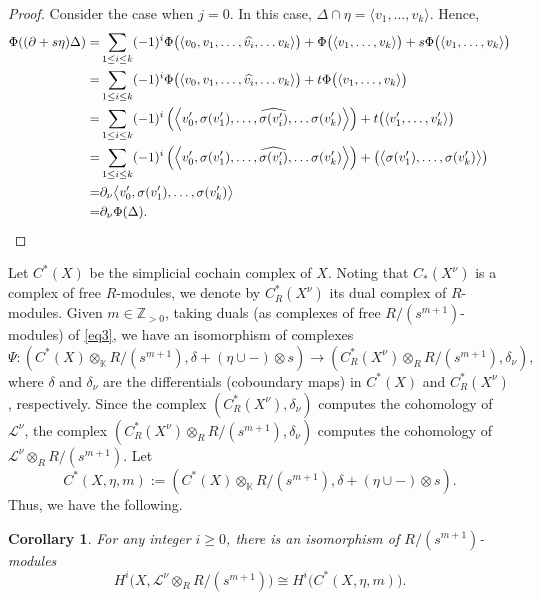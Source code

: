 \documentclass[12pt,leqno,twoside]{amsart}
\theoremstyle{plain}
\newtheorem{cor}[theorem]{Corollary}
\theoremstyle{definition}
\newcommand{\Z}{\mathbb{Z}}
\newcommand{\K}{\mathbb{K}}
\newcommand{\sL}{\mathcal{L}}
\begin{document}
\begin{proof}
Consider the case when $j=0$. In this case, $\Delta\cap \eta=\langle v_1, \ldots, v_k\rangle$. Hence,
\begin{align*}
\Phi((\partial+s\eta)\Delta)=&\sum_{1\leq i\leq k}(-1)^i\Phi\big(\langle v_0, v_1, \ldots, \widehat{v_i}, \ldots v_k\rangle\big)+\Phi\big(\langle v_1, \ldots, v_k\rangle\big)+s\Phi\big(\langle v_1, \ldots, v_k\rangle\big)\\
=&\sum_{1\leq i\leq k}(-1)^i\Phi\big(\langle v_0, v_1, \ldots, \widehat{v_i}, \ldots v_k\rangle\big)+t\Phi\big(\langle v_1, \ldots, v_k\rangle\big)\\
=&\sum_{1\leq i\leq k}(-1)^i\left(\Big\langle v'_0, \sigma(v'_1), \ldots, \widehat{\sigma(v'_i)}, \ldots \sigma(v'_k)\Big\rangle\right)+t\big(\langle v'_1, \ldots, v'_k\rangle\big)\\
=&\sum_{1\leq i\leq k}(-1)^i\left(\left\langle v'_0, \sigma(v'_1), \ldots, \widehat{\sigma(v'_i)}, \ldots \sigma(v'_k)\right\rangle\right)+\big(\big\langle \sigma(v'_1), \ldots, \sigma(v'_k)\big\rangle\big)\\
=&\partial_\nu \big\langle v'_0, \sigma(v'_1), \ldots,  \sigma(v'_k)\big\rangle\\
=&\partial_\nu\Phi(\Delta).\qedhere
\end{align*}
\end{proof}


Let $C^*(X)$  be the simplicial cochain complex of $X$. Noting that $C_*(X^\nu)$ is a complex of free $R$-modules, we denote by $C_R^*(X^\nu)$ its dual complex of $R$-modules. Given $m\in \Z_{>0}$, taking duals (as complexes of free $R/(s^{m+1})$-modules) of \eqref{eq3}, we have an isomorphism of complexes 
\begin{equation*}
\Psi: \left(C^*(X)\otimes_{\K}R/(s^{m+1}), \delta +(\eta \cup -)\otimes s \right)\to \left(C_R^*(X^\nu)\otimes_{R} R/(s^{m+1}), \delta_\nu\right),
\end{equation*}
where $\delta$ and $\delta_\nu$ are the differentials (coboundary maps) in $C^*(X)$ and $C_R^*(X^\nu)$, respectively. Since the complex $(C_R^*(X^\nu), \delta_\nu)$ computes the cohomology of $\sL^\nu$, the complex $(C_R^*(X^\nu)\otimes_{R} R/(s^{m+1}), \delta_\nu)$ computes the cohomology of $\sL^\nu\otimes_R R/(s^{m+1})$.  Let 
$$C^*(X, \eta, m):=(C^*(X)\otimes_{\K}R/(s^{m+1}), \delta +(\eta \cup -)\otimes s).$$ Thus, we have the following.

\begin{cor}
For any integer $i\geq 0$, there is an isomorphism of $R/(s^{m+1})$-modules
\begin{equation} \label{eq2}
H^i\big(X, \sL^\nu\otimes_R R/(s^{m+1})\big)\cong H^i\big(C^*(X, \eta, m)\big).
\end{equation}
\end{cor}
\end{document}
